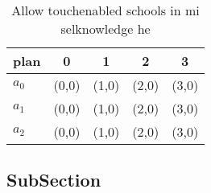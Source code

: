 \documentclass[a4paper]{article}
\begin{document}
\begin{table}
\begin{adjustbox}{width=0.6\columnwidth}
\begin{tabular}{|l|l|l|l|l|}
\hline
\textbf{plan} & \multicolumn{1}{c|}{\textbf{0}} & \multicolumn{1}{c|}{\textbf{1}} & \multicolumn{1}{c|}{\textbf{2}} & \multicolumn{1}{c|}{\textbf{3}} \\ \hline
\textbf{$a_0$}  & (0,0) & (1,0) & (2,0) & (3,0) \\ \hline
\textbf{$a_1$}  & (0,0) & (1,0) & (2,0) & (3,0) \\ \hline
\textbf{$a_2$}  & (0,0) & (1,0) & (2,0) & (3,0) \\ \hline
\end{tabular}
\end{adjustbox}
\caption{Allow touchenabled schools in mi selknowledge he 
}
\end{table}

\subsection{SubSection}
\end{document}
